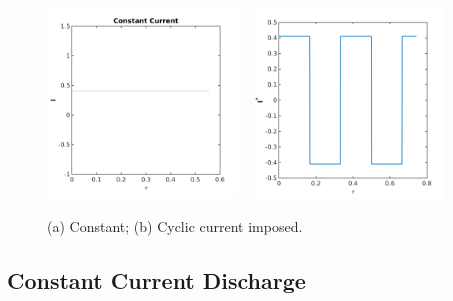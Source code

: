 \documentclass[]{article}
\begin{document}
\vspace{-0.2in}
\begin{figure}[h]
    \centering
    \includegraphics[trim = 0in 0in 0in 0in, clip, width=0.45\textwidth]{figures/I_t_const.png}
    ~
    \includegraphics[trim = 0in 0in 0in 0in, clip, width=0.45\textwidth]{figures/cyclic_new/I_t.png} 
\vspace{-0.2in}         
    \caption{(a) Constant; (b) Cyclic current imposed.}
    \label{fig:I_cycl}    
\end{figure}


\subsection{Constant Current Discharge}
\end{document}
